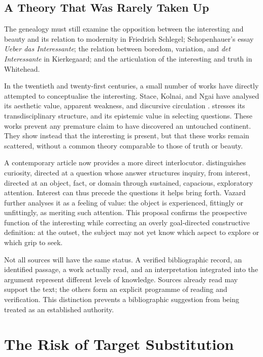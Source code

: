 \documentclass[11pt,a4paper]{article}
\begin{document}
\subsection{A Theory That Was Rarely Taken Up}

The genealogy must still examine the opposition between the interesting and
beauty and its relation to modernity in Friedrich Schlegel; Schopenhauer's essay
\emph{Ueber das Interessante}; the relation between boredom, variation, and
\emph{det Interessante} in Kierkegaard; and the articulation of the interesting
and truth in Whitehead.

In the twentieth and twenty-first centuries, a small number of works have
directly attempted to conceptualise the interesting. Stace, Kolnai, and Ngai
have analysed its aesthetic value, apparent weakness, and discursive circulation
\parencite{stace1944interestingness,kolnai1964concept,ngai2008merely,ngai2012categories}.
\textcite{epstein2009interesting} stresses its transdisciplinary structure, and
\textcite{grimm2011interesting} its epistemic value in selecting questions.
These works prevent any premature claim to have discovered an untouched
continent. They show instead that the interesting is present, but that these
works remain scattered, without a common theory comparable to those of truth or beauty.

A contemporary article now provides a more direct interlocutor.
\textcite{vazard2026inquiry} distinguishes curiosity, directed at a question
whose answer structures inquiry, from interest, directed at an object, fact, or
domain through sustained, capacious, exploratory attention. Interest can thus
precede the questions it helps bring forth. Vazard further analyses it as a
feeling of value: the object is experienced, fittingly or unfittingly, as
meriting such attention. This proposal confirms the prospective function of the
interesting while correcting an overly goal-directed constructive definition:
at the outset, the subject may not yet know which aspect to explore or which
grip to seek.

Not all sources will have the same status. A verified bibliographic record, an
identified passage, a work actually read, and an interpretation integrated into
the argument represent different levels of knowledge. Sources already read may
support the text; the others form an
explicit programme of reading and verification. This distinction prevents a
bibliographic suggestion from being treated as an established authority.

\section{The Risk of Target Substitution}
\end{document}
